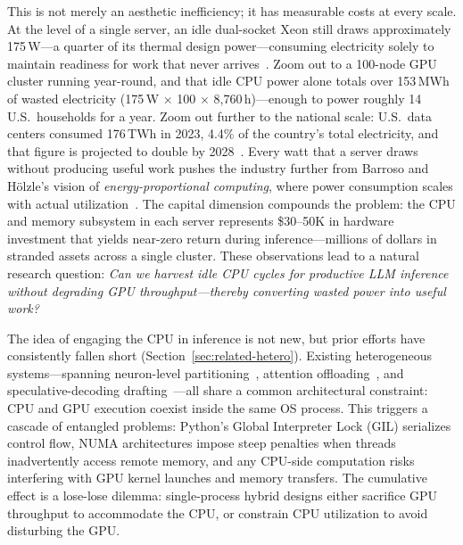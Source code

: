 \documentclass[10pt,conference]{IEEEtran}
\begin{document}
This is not merely an aesthetic inefficiency; it has measurable costs at every scale.
At the level of a single server, an idle dual-socket Xeon still draws approximately 175\,W---a quarter of its thermal design power---consuming electricity solely to maintain readiness for work that never arrives~\cite{specpower2024}.
Zoom out to a 100-node GPU cluster running year-round, and that idle CPU power alone totals over 153\,MWh of wasted electricity (175\,W $\times$ 100 $\times$ 8{,}760\,h)---enough to power roughly 14 U.S.\ households for a year.
Zoom out further to the national scale: U.S.\ data centers consumed 176\,TWh in 2023, 4.4\% of the country's total electricity, and that figure is projected to double by 2028~\cite{lbnl2024datacenter}.
Every watt that a server draws without producing useful work pushes the industry further from Barroso and H\"{o}lzle's vision of \emph{energy-proportional computing}, where power consumption scales with actual utilization~\cite{barroso2007energy}.
The capital dimension compounds the problem: the CPU and memory subsystem in each server represents \$30--50K in hardware investment that yields near-zero return during inference---millions of dollars in stranded assets across a single cluster.
These observations lead to a natural research question: \emph{Can we harvest idle CPU cycles for productive LLM inference without degrading GPU throughput---thereby converting wasted power into useful work?}

The idea of engaging the CPU in inference is not new, but prior efforts have consistently fallen short (Section~\ref{sec:related-hetero}).
Existing heterogeneous systems---spanning neuron-level partitioning~\cite{song2024powerinfer}, attention offloading~\cite{neo2025}, and speculative-decoding drafting~\cite{dovetail2024, apex2025}---all share a common architectural constraint: CPU and GPU execution coexist inside the same OS process.
This triggers a cascade of entangled problems: Python's Global Interpreter Lock (GIL) serializes control flow, NUMA architectures impose steep penalties when threads inadvertently access remote memory, and any CPU-side computation risks interfering with GPU kernel launches and memory transfers.
The cumulative effect is a lose-lose dilemma: single-process hybrid designs either sacrifice GPU throughput to accommodate the CPU, or constrain CPU utilization to avoid disturbing the GPU.
\end{document}
